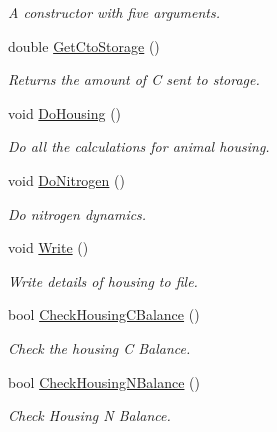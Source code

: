 \begin{DoxyCompactItemize}
\begin{DoxyCompactList}\small\item\em A constructor with five arguments. \end{DoxyCompactList}\item 
double \mbox{\hyperlink{classhousing_ad26e09572df342d9e0b17400f24720ef}{Get\+Cto\+Storage}} ()
\begin{DoxyCompactList}\small\item\em Returns the amount of C sent to storage. \end{DoxyCompactList}\item 
\mbox{\label{classhousing_af7e45d8da4358309aaacb9d24bb19523}} 
void \mbox{\hyperlink{classhousing_af7e45d8da4358309aaacb9d24bb19523}{Do\+Housing}} ()
\begin{DoxyCompactList}\small\item\em Do all the calculations for animal housing. \end{DoxyCompactList}\item 
\mbox{\label{classhousing_a50306a2782cf072bc5b353331f001cf9}} 
void \mbox{\hyperlink{classhousing_a50306a2782cf072bc5b353331f001cf9}{Do\+Nitrogen}} ()
\begin{DoxyCompactList}\small\item\em Do nitrogen dynamics. \end{DoxyCompactList}\item 
\mbox{\label{classhousing_a589942e33cabe72d088f1428d076d8ac}} 
void \mbox{\hyperlink{classhousing_a589942e33cabe72d088f1428d076d8ac}{Write}} ()
\begin{DoxyCompactList}\small\item\em Write details of housing to file. \end{DoxyCompactList}\item 
bool \mbox{\hyperlink{classhousing_afc648290d69e019a0ef2b6bf0ef4dc43}{Check\+Housing\+C\+Balance}} ()
\begin{DoxyCompactList}\small\item\em Check the housing C Balance. \end{DoxyCompactList}\item 
bool \mbox{\hyperlink{classhousing_af5df42adc33faded1ac9814881629c85}{Check\+Housing\+N\+Balance}} ()
\begin{DoxyCompactList}\small\item\em Check Housing N Balance. \end{DoxyCompactList}\end{DoxyCompactItemize}


